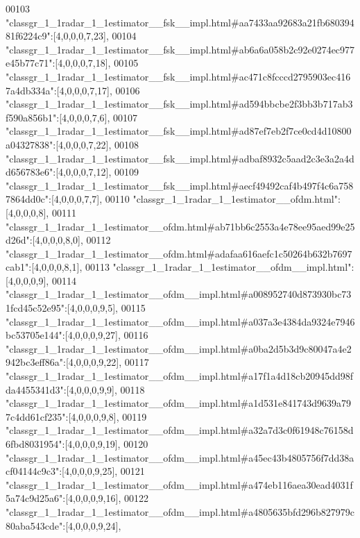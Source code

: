 \begin{DoxyCode}
00103 \textcolor{stringliteral}{"classgr\_1\_1radar\_1\_1estimator\_\_fsk\_\_impl.html#aa7433aa92683a21fb68039481f6224c9"}:[4,0,0,0,7,23],
00104 \textcolor{stringliteral}{"classgr\_1\_1radar\_1\_1estimator\_\_fsk\_\_impl.html#ab6a6a058b2c92e0274ec977e45b77c71"}:[4,0,0,0,7,18],
00105 \textcolor{stringliteral}{"classgr\_1\_1radar\_1\_1estimator\_\_fsk\_\_impl.html#ac471c8fcccd2795903ec4167a4db334a"}:[4,0,0,0,7,17],
00106 \textcolor{stringliteral}{"classgr\_1\_1radar\_1\_1estimator\_\_fsk\_\_impl.html#ad594bbcbe2f3bb3b717ab3f590a856b1"}:[4,0,0,0,7,6],
00107 \textcolor{stringliteral}{"classgr\_1\_1radar\_1\_1estimator\_\_fsk\_\_impl.html#ad87ef7eb2f7ce0cd4d10800a04327838"}:[4,0,0,0,7,22],
00108 \textcolor{stringliteral}{"classgr\_1\_1radar\_1\_1estimator\_\_fsk\_\_impl.html#adbaf8932c5aad2c3e3a2a4dd656783e6"}:[4,0,0,0,7,12],
00109 \textcolor{stringliteral}{"classgr\_1\_1radar\_1\_1estimator\_\_fsk\_\_impl.html#aecf49492caf4b497f4c6a7587864dd0c"}:[4,0,0,0,7,7],
00110 \textcolor{stringliteral}{"classgr\_1\_1radar\_1\_1estimator\_\_ofdm.html"}:[4,0,0,0,8],
00111 \textcolor{stringliteral}{"classgr\_1\_1radar\_1\_1estimator\_\_ofdm.html#ab71bb6c2553a4e78ee95aed99e25d26d"}:[4,0,0,0,8,0],
00112 \textcolor{stringliteral}{"classgr\_1\_1radar\_1\_1estimator\_\_ofdm.html#adafaa616aefc1c50264b632b7697cab1"}:[4,0,0,0,8,1],
00113 \textcolor{stringliteral}{"classgr\_1\_1radar\_1\_1estimator\_\_ofdm\_\_impl.html"}:[4,0,0,0,9],
00114 \textcolor{stringliteral}{"classgr\_1\_1radar\_1\_1estimator\_\_ofdm\_\_impl.html#a008952740d873930bc731fcd45c52e95"}:[4,0,0,0,9,5],
00115 \textcolor{stringliteral}{"classgr\_1\_1radar\_1\_1estimator\_\_ofdm\_\_impl.html#a037a3e4384da9324e7946bc53705e144"}:[4,0,0,0,9,27],
00116 \textcolor{stringliteral}{"classgr\_1\_1radar\_1\_1estimator\_\_ofdm\_\_impl.html#a0ba2d5b3d9c80047a4e2942bc3eff86a"}:[4,0,0,0,9,22],
00117 \textcolor{stringliteral}{"classgr\_1\_1radar\_1\_1estimator\_\_ofdm\_\_impl.html#a17f1a4d18cb20945dd98fda4455341d3"}:[4,0,0,0,9,9],
00118 \textcolor{stringliteral}{"classgr\_1\_1radar\_1\_1estimator\_\_ofdm\_\_impl.html#a1d531e841743d9639a797c4dd61cf235"}:[4,0,0,0,9,8],
00119 \textcolor{stringliteral}{"classgr\_1\_1radar\_1\_1estimator\_\_ofdm\_\_impl.html#a32a7d3c0f61948c76158d6fbd8031954"}:[4,0,0,0,9,19],
00120 \textcolor{stringliteral}{"classgr\_1\_1radar\_1\_1estimator\_\_ofdm\_\_impl.html#a45ec43b4805756f7dd38acf04144c9c3"}:[4,0,0,0,9,25],
00121 \textcolor{stringliteral}{"classgr\_1\_1radar\_1\_1estimator\_\_ofdm\_\_impl.html#a474eb116aea30ead4031f5a74c9d25a6"}:[4,0,0,0,9,16],
00122 \textcolor{stringliteral}{"classgr\_1\_1radar\_1\_1estimator\_\_ofdm\_\_impl.html#a4805635bfd296b827979c80aba543cde"}:[4,0,0,0,9,24],

\end{DoxyCode}
